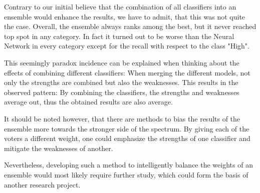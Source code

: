 Contrary to our initial believe that the combination of all
classifiers into an ensemble would enhance the results, we have to
admit, that this was not quite the case. Overall, the ensemble always
ranks among the best, but it never reached top spot in any
category. In fact it turned out to be worse than the Neural Network in
every category except for the recall with respect to the class "High".

This seemingly paradox incidence can be explained when
thinking about the effects of combining different classifiers: When
merging the different models, not only the strengths are combined but
also the weaknesses. This results in the observed pattern: By
combining the classifiers, the strengths and weaknesses average out,
thus the obtained results are also average.

It should be noted however, that there are methods to bias the results
of the ensemble more towards the stronger side of the spectrum.
By giving each of the voters a different weight, one could emphasize the
strengths of one classifier and mitigate the weaknesses of
another.

Nevertheless, developing such a method to intelligently balance the weights of an
ensemble would most likely require further study, which
could form the basis of another research project.
